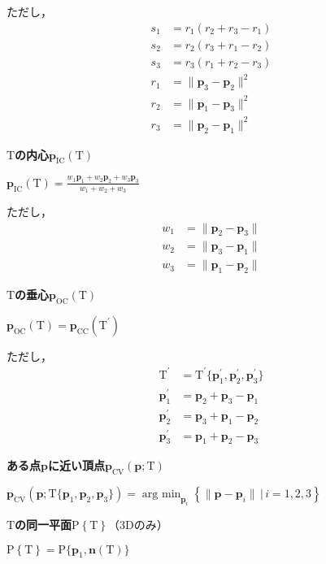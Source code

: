 ﻿\documentclass[a4paper]{jsarticle}
\begin{document}
ただし，
\begin{align*}
s_{1}&=r_{1}(r_{2}+r_{3}-r_{1})
\\
s_{2}&=r_{2}(r_{3}+r_{1}-r_{2})
\\
s_{3}&=r_{3}(r_{1}+r_{2}-r_{3})
\\
r_{1}&=\|\bm{p}_{3}-\bm{p}_{2}\|^{2}
\\
r_{2}&=\|\bm{p}_{1}-\bm{p}_{3}\|^{2}
\\
r_{3}&=\|\bm{p}_{2}-\bm{p}_{1}\|^{2}
\end{align*}

{\bf $\mathrm{T}$の内心$\bm{p}_{\mathrm{IC}}(\mathrm{T})$}

$\bm{p}_{\mathrm{IC}}(\mathrm{T})=\frac{\displaystyle w_{1}\bm{p}_{1}+w_{2}\bm{p}_{2}+w_{3}\bm{p}_{3}}{w_{1}+w_{2}+w_{3}}$

ただし，
\begin{align*}
w_{1}&=\|\bm{p}_{2}-\bm{p}_{3}\|
\\
w_{2}&=\|\bm{p}_{3}-\bm{p}_{1}\|
\\
w_{3}&=\|\bm{p}_{1}-\bm{p}_{2}\|
\end{align*}

{\bf $\mathrm{T}$の垂心$\bm{p}_{\mathrm{OC}}(\mathrm{T})$}

$\bm{p}_{\mathrm{OC}}(\mathrm{T})=\bm{p}_{\mathrm{CC}}(\mathrm{T}^{\prime})$

ただし，
\begin{align*}
\mathrm{T}^{\prime}&=\mathrm{T}^{\prime}\{\bm{p}_{1}^{\prime},\bm{p}_{2}^{\prime},\bm{p}_{3}^{\prime}\}
\\
\bm{p}_{1}^{\prime}&=\bm{p}_{2}+\bm{p}_{3}-\bm{p}_{1}
\\
\bm{p}_{2}^{\prime}&=\bm{p}_{3}+\bm{p}_{1}-\bm{p}_{2}
\\
\bm{p}_{3}^{\prime}&=\bm{p}_{1}+\bm{p}_{2}-\bm{p}_{3}
\end{align*}

{\bf ある点$\bm{p}$に近い頂点$\bm{p}_{\mathrm{CV}}(\bm{p};\mathrm{T})$}

$\bm{p}_{\mathrm{CV}}(\bm{p};\mathrm{T}\{\bm{p}_{1},\bm{p}_{2},\bm{p}_{3}\})=\mathop{\mathrm{arg~min}}_{\bm{p}_{i}}\left\{\|\bm{p}-\bm{p}_{i}\|\,|\,i=1,2,3 \right\}$

{\bf $\mathrm{T}$の同一平面$\mathrm{P}\left\{\mathrm{T}\right\}$}（3Dのみ）

$\mathrm{P}\left\{\mathrm{T}\right\}=\mathrm{P}\{\bm{p}_{1},\bm{n}(\mathrm{T})\}$
\end{document}
